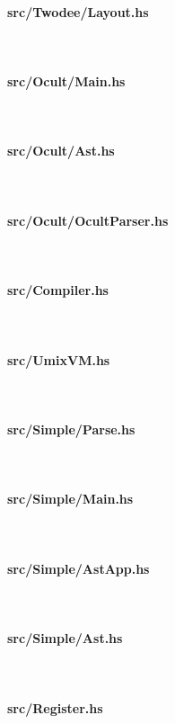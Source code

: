\documentclass[a4paper, oneside, 10pt, final]{memoir}
\begin{document}

\clearpage\paragraph{src/Twodee/Layout.hs}\ \\

\clearpage\paragraph{src/Ocult/Main.hs}\ \\

\clearpage\paragraph{src/Ocult/Ast.hs}\ \\

\clearpage\paragraph{src/Ocult/OcultParser.hs}\ \\

\clearpage\paragraph{src/Compiler.hs}\ \\

\clearpage\paragraph{src/UmixVM.hs}\ \\

\clearpage\paragraph{src/Simple/Parse.hs}\ \\

\clearpage\paragraph{src/Simple/Main.hs}\ \\

\clearpage\paragraph{src/Simple/AstApp.hs}\ \\

\clearpage\paragraph{src/Simple/Ast.hs}\ \\

\clearpage\paragraph{src/Register.hs}\ \\

\end{document}
